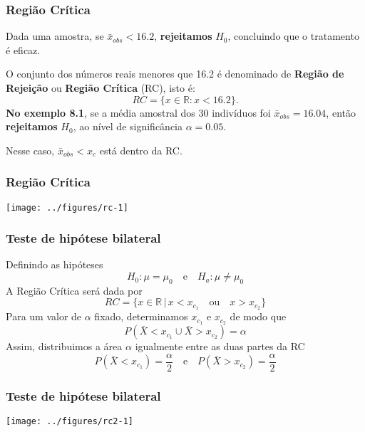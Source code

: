 \documentclass{beamer}
\begin{document}
\begin{frame}
\frametitle{Região Crítica}

Dada uma amostra, se \(\bar{x}_{obs} < 16.2\), \textbf{rejeitamos}
\(H_0\), concluindo que o tratamento é eficaz.

O conjunto dos números reais menores que 16.2 é denominado de
\textbf{Região de Rejeição} ou \textbf{Região Crítica} (RC), isto é: \[
RC = \{ x \in \mathbb{R} : x < 16.2 \}.
\] \textbf{No exemplo 8.1}, se a média amostral dos 30 indivíduos foi
\(\bar{x}_{obs} = 16.04\), então \textbf{rejeitamos} \(H_0\), ao nível
de significância \(\alpha = 0.05\).

Nesse caso, \(\bar{x}_{obs} < x_c\) está dentro da RC.
\end{frame}


\begin{frame}
\frametitle{Região Crítica}

\begin{center}\texttt{[image: ../figures/rc-1]} \end{center}
\end{frame}

\begin{frame}
\frametitle{Teste de hipótese bilateral}

Definindo as hipóteses \[
H_0: \mu = \mu_0 \quad \text{e} \quad H_a: \mu \neq \mu_0
\] A Região Crítica será dada por \[
RC = \{x \in \mathbb{R} \, | \, x < x_{c_1} \quad \text{ou} \quad x >
x_{c_2} \}
\] Para um valor de \(\alpha\) fixado, determinamos \(x_{c_1}\) e
\(x_{c_2}\) de modo que \[
P(\bar{X} < x_{c_1} \cup \bar{X} > x_{c_2}) = \alpha
\] Assim, distribuimos a área \(\alpha\) igualmente entre as duas partes
da RC \[
P(\bar{X} < x_{c_1}) = \frac{\alpha}{2} \quad \text{e} \quad P(
\bar{X} > x_{c_2}) = \frac{\alpha}{2}
\]
\end{frame}

\begin{frame}
\frametitle{Teste de hipótese bilateral}


\begin{center}\texttt{[image: ../figures/rc2-1]} \end{center}
\end{frame}
\end{document}
